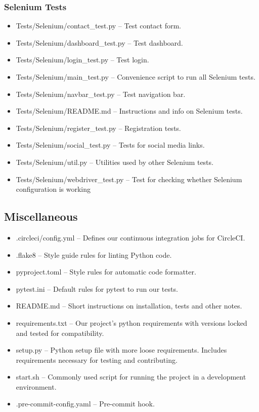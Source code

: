 \documentclass[main.tex]{subfiles}
\begin{document}
\subsubsection{Selenium Tests}\label{selenium-tests}

\begin{itemize}

\item
  Tests/Selenium/contact\_test.py -- Test contact form.
\item
  Tests/Selenium/dashboard\_test.py -- Test dashboard.
\item
  Tests/Selenium/login\_test.py -- Test login.
\item
  Tests/Selenium/main\_test.py -- Convenience script to run all Selenium tests.
\item
  Tests/Selenium/navbar\_test.py -- Test navigation bar.
\item
  Tests/Selenium/README.md -- Instructions and info on Selenium tests.
\item
  Tests/Selenium/register\_test.py -- Registration tests.
\item
  Tests/Selenium/social\_test.py -- Tests for social media links.
\item
  Tests/Selenium/util.py -- Utilities used by other Selenium tests.
\item
  Tests/Selenium/webdriver\_test.py -- Test for checking whether Selenium configuration is working
\end{itemize}

\subsection{Miscellaneous}\label{misc-files}

\begin{itemize}

\item
  .circleci/config.yml -- Defines our continuous integration jobs for CircleCI.
\item
  .flake8 -- Style guide rules for linting Python code.
\item
  pyproject.toml -- Style rules for automatic code formatter.
\item
  pytest.ini -- Default rules for pytest to run our tests.
\item
  README.md -- Short instructions on installation, tests and other notes.
\item
  requirements.txt -- Our project's python requirements with versions locked and tested for compatibility.
\item
  setup.py -- Python setup file with more loose requirements. Includes requirements necessary for testing and contributing.
\item
  start.sh -- Commonly used script for running the project in a development environment.
\item
  .pre-commit-config.yaml -- Pre-commit hook.
\end{itemize}
\end{document}
